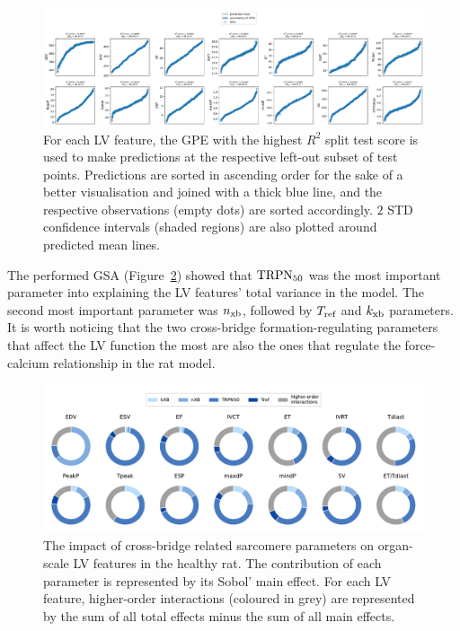 \begin{figure}[!ht]
    \myfloatalign
    \includegraphics[width=\textwidth]{figures/chapter05/bgpes_vs_bsplit_om.pdf}
    \caption{For each LV feature, the GPE with the highest $R^2$ split test score is used to make predictions at the respective left-out subset of test points. Predictions are sorted in ascending order for the sake of a better visualisation and joined with a thick blue line, and the respective observations (empty dots) are sorted accordingly. $2$ STD confidence intervals (shaded regions) are also plotted around predicted mean lines.}
    \label{fig:omgpes}
\end{figure}

\vspace{0.2cm}
The performed GSA (Figure~\ref{fig:omgsa}) showed that $\textrm{TRPN}_{50}$ was the most important parameter into explaining the LV features' total variance in the model. The second most important parameter was $n_{\textrm{xb}}$, followed by $T_{\textrm{ref}}$ and $k_{\textrm{xb}}$ parameters. It is worth noticing that the two cross-bridge formation-regulating parameters that affect the LV function the most are also the ones that regulate the force-calcium relationship in the rat model.

\begin{figure}[!ht]
    \myfloatalign
    \includegraphics[width=\textwidth]{figures/chapter05/gsa_om.pdf}
    \caption{The impact of cross-bridge related sarcomere parameters on organ-scale LV features in the healthy rat. The contribution of each parameter is represented by its Sobol' main effect. For each LV feature, higher-order interactions (coloured in grey) are represented by the sum of all total effects minus the sum of all main effects.}
    \label{fig:omgsa}
\end{figure}



